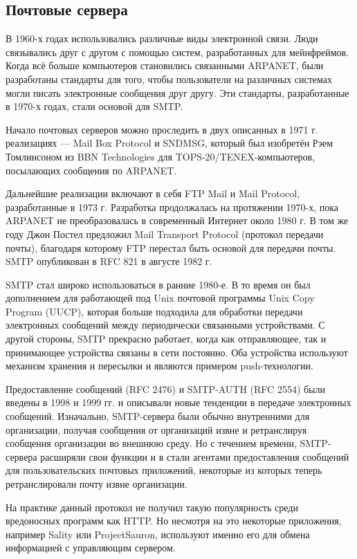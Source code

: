 \subsection{Почтовые сервера}

В 1960-х годах использовались различные виды электронной связи. Люди связывались друг с другом с помощью систем, разработанных для мейнфреймов. Когда всё больше компьютеров становились связанными ARPANET, были разработаны стандарты для того, чтобы пользователи на различных системах могли писать электронные сообщения друг другу. Эти стандарты, разработанные в 1970-х годах, стали основой для SMTP.

Начало почтовых серверов можно проследить в двух описанных в 1971 г. реализациях — Mail Box Protocol и SNDMSG, который был изобретён Рэем Томлинсоном из BBN Technologies для TOPS-20/TENEX-компьютеров, посылающих сообщения по ARPANET.

Дальнейшие реализации включают в себя FTP Mail и Mail Protocol, разработанные в 1973 г. Разработка продолжалась на протяжении 1970-х, пока ARPANET не преобразовалась в современный Интернет около 1980 г. В том же году Джон Постел предложил Mail Transport Protocol (протокол передачи почты), благодаря которому FTP перестал быть основой для передачи почты. SMTP опубликован в RFC 821 в августе 1982 г.

SMTP стал широко использоваться в ранние 1980-е. В то время он был дополнением для работающей под Unix почтовой программы Unix Copy Program (UUCP), которая больше подходила для обработки передачи электронных сообщений между периодически связанными устройствами. С другой стороны, SMTP прекрасно работает, когда как отправляющее, так и принимающее устройства связаны в сети постоянно. Оба устройства используют механизм хранения и пересылки и являются примером push-технологии.

Предоставление сообщений (RFC 2476) и SMTP-AUTH (RFC 2554) были введены в 1998 и 1999 гг. и описывали новые тенденции в передаче электронных сообщений. Изначально, SMTP-сервера были обычно внутренними для организации, получая сообщения от организаций извне и ретранслируя сообщения организации во внешнюю среду. Но с течением времени, SMTP-сервера расширяли свои функции и в стали агентами предоставления сообщений для пользовательских почтовых приложений, некоторые из которых теперь ретранслировали почту извне организации.

На практике данный протокол не получил такую популярность среди вредоносных программ как HTTP. Но несмотря на это некоторые приложения, например Sality или ProjectSauron, используют именно его для обмена информацией с управляющим сервером.